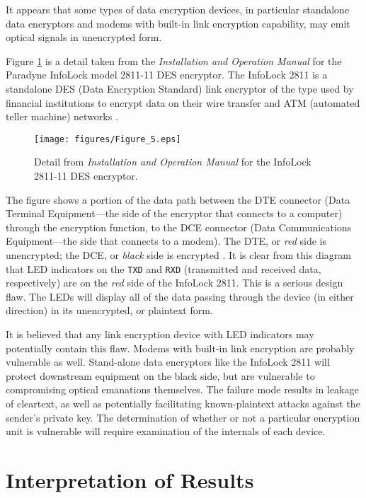 \documentclass{acmtrans2e}
\begin{document}
It appears that some types of data encryption devices, in particular 
stand\-alone data encryptors and modems with built-in link encryption 
capability, may emit optical signals in unencrypted form.

Figure \ref{infolock_2811_figure} is a detail taken from the {\it 
Installation and Operation Manual} for the Paradyne InfoLock model
2811-11 DES encryptor.  The InfoLock 2811 is a stand\-alone DES (Data 
Encryption Standard) link encryptor of the type used by financial 
institutions to encrypt data on their wire transfer and ATM (automated
teller machine) networks \cite{Paradyne1985}.

\begin{figure}
\centering
\texttt{[image: figures/Figure\_5.eps]}
\caption{Detail from {\it Installation and Operation Manual} 
for the InfoLock 2811-11 DES encryptor.}
\label{infolock_2811_figure}
\end{figure}

The figure shows a portion of the data path between the DTE connector 
(Data Terminal Equipment---the side of the encryptor that connects to a 
computer) through the encryption function, to the DCE connector (Data 
Communications Equipment---the side that connects to a modem).  The DTE, 
or {\it red} side is unencrypted; the DCE, or {\it black} side is 
encrypted \cite{mil_hdbk_232_a}.  It is clear from this diagram that LED 
indicators on the {\tt TXD} and {\tt RXD} (transmitted and received 
data, respectively) are on the {\it red} side of the InfoLock 2811.
This is a serious design 
flaw.  The LEDs will display all of the data passing through the device 
(in either direction) in its unencrypted, or plaintext form.

It is believed that any link encryption device with LED indicators may 
potentially contain this flaw.  Modems with built-in link encryption are 
probably vulnerable as well.  Stand-alone data encryptors like the InfoLock 2811 
will protect downstream equipment on the black side, but are vulnerable
to compromising 
optical emanations themselves.  The failure mode results in leakage of 
cleartext, as well as potentially facilitating known-plaintext attacks
against the sender's private key.  The determination of whether or not a 
particular encryption unit is vulnerable will require examination of the 
internals of each device.

\section{Interpretation of Results}
\end{document}
